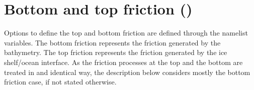 \documentclass[../main/NEMO_manual]{subfiles}
\begin{document}
\section[Bottom and top friction (\textit{zdfdrg.F90})]{Bottom and top friction (\protect{})}
\label{sec:ZDF_drg}

\begin{listing}
  \caption{}
  \label{lst:namdrg}
\end{listing}

\begin{listing}
  \caption{}
  \label{lst:namdrg_top}
\end{listing}

\begin{listing}
  \caption{}
  \label{lst:namdrg_bot}
\end{listing}

Options to define the top and bottom friction are defined through the  namelist variables.
The bottom friction represents the friction generated by the bathymetry.
The top friction represents the friction generated by the ice shelf/ocean interface.
As the friction processes at the top and the bottom are treated in and identical way,
the description below considers mostly the bottom friction case, if not stated otherwise.
\end{document}
